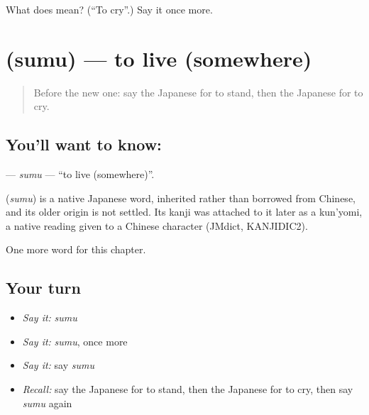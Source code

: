 \begin{tcolorbox}[breakable,colback=teal!4,colframe=teal!35!black,title={Before you move on}]
What does  mean? (\textquotedblleft{}To cry\textquotedblright{}.) Say it once more.
\end{tcolorbox}
\section[\texorpdfstring{\ja{すむ} (sumu)}{すむ (sumu)}]{ (sumu) — to live (somewhere)}

\label{lesson:JA-C29-sumu}



\begin{quote}
Before the new one: say the Japanese for to stand, then the Japanese for to cry.
\end{quote}

\subsection*{You'll want to know: }
\textbf{} — \emph{sumu} — \textquotedblleft{}to live (somewhere)\textquotedblright{}.

\begin{cousinweb}
\textbf{} (\emph{sumu}) is a native Japanese word, inherited rather than borrowed from Chinese, and its older origin is not settled. Its kanji was attached to it later as a kun'yomi, a native reading given to a Chinese character (JMdict, KANJIDIC2).
\end{cousinweb}

\begin{grammarlens}[title={What you've built}]
One more word for this chapter.
\end{grammarlens}

\subsection*{Your turn}
\begin{itemize}
\raggedright
  \item \emph{Say it:} \emph{sumu}
  \item \emph{Say it:} \emph{sumu}, once more
  \item \emph{Say it:} say \emph{sumu}
  \item \emph{Recall:} say the Japanese for to stand, then the Japanese for to cry, then say \emph{sumu} again
\end{itemize}

